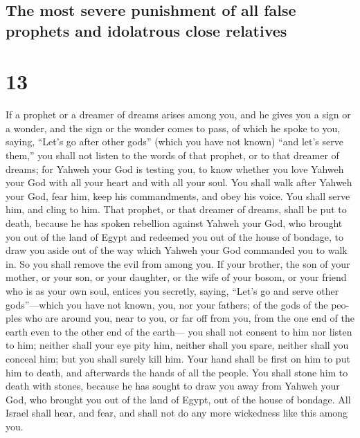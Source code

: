 \begin{paracol}{2}
\switchcolumn
\begin{otherlanguage}{english}

\hypertarget{the-most-severe-punishment-of-all-false-prophets-and-idolatrous-close-relatives}{%
\subsection{The most severe punishment of all false prophets and
idolatrous close
relatives}\label{the-most-severe-punishment-of-all-false-prophets-and-idolatrous-close-relatives}}

\hypertarget{section-25}{%
\section{13}\label{section-25}}

 If a prophet or a dreamer of dreams arises among you, and
he gives you a sign or a wonder,  and the sign or the
wonder comes to pass, of which he spoke to you, saying, ``Let's go after
other gods'' (which you have not known) ``and let's serve them,''
 you shall not listen to the words of that prophet, or to
that dreamer of dreams; for Yahweh your God is testing you, to know
whether you love Yahweh your God with all your heart and with all your
soul.  You shall walk after Yahweh your God, fear him,
keep his commandments, and obey his voice. You shall serve him, and
cling to him.  That prophet, or that dreamer of dreams,
shall be put to death, because he has spoken rebellion against Yahweh
your God, who brought you out of the land of Egypt and redeemed you out
of the house of bondage, to draw you aside out of the way which Yahweh
your God commanded you to walk in. So you shall remove the evil from
among you.  If your brother, the son of your mother, or
your son, or your daughter, or the wife of your bosom, or your friend
who is as your own soul, entices you secretly, saying, ``Let's go and
serve other gods''---which you have not known, you, nor your fathers;
 of the gods of the peoples who are around you, near to
you, or far off from you, from the one end of the earth even to the
other end of the earth---  you shall not consent to him
nor listen to him; neither shall your eye pity him, neither shall you
spare, neither shall you conceal him;  but you shall
surely kill him. Your hand shall be first on him to put him to death,
and afterwards the hands of all the people.  You shall
stone him to death with stones, because he has sought to draw you away
from Yahweh your God, who brought you out of the land of Egypt, out of
the house of bondage.  All Israel shall hear, and fear,
and shall not do any more wickedness like this among you.


\end{otherlanguage}
\end{paracol}
